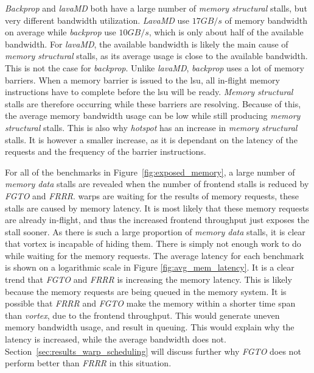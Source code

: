 \textit{Backprop} and \textit{lavaMD} both have a large number of \textit{memory structural} stalls, but very different bandwidth utilization. \textit{LavaMD} use $17GB/s$ of memory bandwidth on average while \textit{backprop} use $10GB/s$, which is only about half of the available bandwidth. For \textit{lavaMD}, the available bandwidth is likely the main cause of \textit{memory structural} stalls, as its average usage is close to the available bandwidth. This is not the case for \textit{backprop}. Unlike \textit{lavaMD}, \textit{backprop} uses a lot of memory barriers. When a memory barrier is issued to the \acrshort{lsu}, all in-flight memory instructions have to complete before the \acrshort{lsu} will be ready. \textit{Memory structural} stalls are therefore occurring while these barriers are resolving. Because of this, the average memory bandwidth usage can be low while still producing \textit{memory structural} stalls. This is also why \textit{hotspot} has an increase in \textit{memory structural} stalls. It is however a smaller increase, as it is dependant on the latency of the requests and the frequency of the barrier instructions.

For all of the benchmarks in Figure~\ref{fig:exposed_memory}, a large number of \textit{memory data} stalls are revealed when the number of frontend stalls is reduced by \textit{FGTO} and \textit{FRRR}.  warps are waiting for the results of memory requests, these stalls are caused by memory latency. It is most likely that these memory requests are already in-flight, and thus the increased frontend throughput just exposes the stall sooner. As there is such a large proportion of \textit{memory data} stalls, it is clear that \Gls{vortex} is incapable of hiding them. There is simply not enough work to do while waiting for the memory requests. The average latency for each benchmark is shown on a logarithmic scale in Figure \ref{fig:avg_mem_latency}. It is a clear trend that \textit{FGTO} and \textit{FRRR} is increasing the memory latency. This is likely because the memory requests are being queued in the memory system. It is possible that \textit{FRRR} and \textit{FGTO} make the memory  within a shorter time span than \textit{\Gls{vortex}}, due to the frontend throughput. This would generate uneven memory bandwidth usage, and result in queuing. This would explain why the latency is increased, while the average bandwidth does not. Section~\ref{sec:results_warp_scheduling} will discuss further why \textit{FGTO} does not perform better than \textit{FRRR} in this situation.

